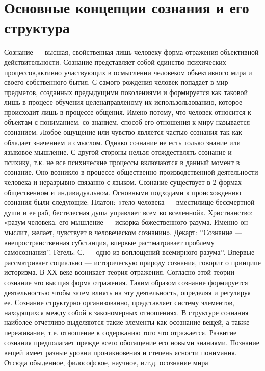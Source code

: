 \documentclass[12pt]{article}
\begin{document}
\section{Основные концепции сознания и его структура}
Сознание — высшая, свойственная лишь человеку форма отражения обьективной действительности. Сознание
представляет  собой  единство  психических  процессов,активно  участвующих  в  осмыслении  человеком
обьективного  мира  и  своего  собственного  бытия.  С  самого  рождения  человек  попадает  в  мир  предметов,
созданных предыдущими поколениями и формируется как таковой лишь в процесе обучения целенаправленому
их использользованию, которое происходит лишь в процессе общения. Имено потому, что человек относится к
объектам с пониманием, со знанием, способ его отношения к миру называется сознанием. Любое ощущение
или чувство является частью сознания так как обладает значением и смыслом. Однако сознание не есть только
знание  или  языковое  мышление.  С  другой  стороны  нельзя  отождествлять  сознание  и  психику,  т.к.  не  все
психические  процессы  включаются  в  данный  момент  в  сознание.  Оно  возникло  в  процессе  общественно-производственной деятельности человека и неразрывно связанно с языком. Сознание существует в 2 формах —
общественном  и  индивидуальном.  Основными  подходами  к  происхождению  сознания  были  следующие:
Платон: «тело  человека  — вместилище  бессмертной  души и ее  раб,  бестелесная душа управляет всем  во
вселенной».  Христианство:  «разум  человека,  его  мышление  —  искорка  божественного  разума.  Именно  он
мыслит, желает, чувствует в человеческом сознании». Декарт: ’’Сознание — внепространственная субстанция,
впервые  расnматривает  проблему  самосознания’’.  Гегель:  С.  —  одно  из  воплощений  всемирного  разума’’.
Впервые рассматривает социально — историческую природу сознания, говорит о принципе историзма. В ХХ
веке возникает теория отражения. Согласно этой теории сознание это высщая форма отражения. Таким образом
сознание формируется деятельностью чтобы затем влиять на эту деятельность, определяя и регулируя ее.
Сознание  структурно  организованно,  представляет  систему  элементов,  находящихся  между  собой  в
закономерных  отношениях.  В  структуре  сознания  наиболее  отчетливо  выделяются  такие  элементы  как
осознание вещей, а также переживание, т.е. отношение к содержанию того что отражается. Развитие сознания
предполагает  прежде  всего  обогащение  его  новыми  знаниями.  Познание  вещей  имеет  разные  уровни
проникновения и степень ясности понимания. Отсюда обыденное, философское, научное, и.т.д. осознание мира
\end{document}
